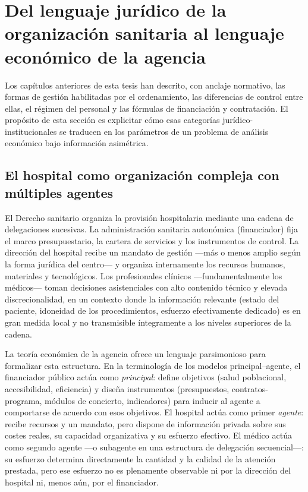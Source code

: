 \section{Del lenguaje jurídico de la organización sanitaria al lenguaje económico de la agencia}
\label{sec:bisagra}

Los capítulos anteriores de esta tesis han descrito, con anclaje normativo, las formas de gestión habilitadas por el ordenamiento, las diferencias de control entre ellas, el régimen del personal y las fórmulas de financiación y contratación. El propósito de esta sección es explicitar cómo esas categorías jurídico-institucionales se traducen en los parámetros de un problema de análisis económico bajo información asimétrica.

\subsection{El hospital como organización compleja con múltiples agentes}

El Derecho sanitario organiza la provisión hospitalaria mediante una cadena de delegaciones sucesivas. La administración sanitaria autonómica (financiador) fija el marco presupuestario, la cartera de servicios y los instrumentos de control. La dirección del hospital recibe un mandato de gestión ---más o menos amplio según la forma jurídica del centro--- y organiza internamente los recursos humanos, materiales y tecnológicos. Los profesionales clínicos ---fundamentalmente los médicos--- toman decisiones asistenciales con alto contenido técnico y elevada discrecionalidad, en un contexto donde la información relevante (estado del paciente, idoneidad de los procedimientos, esfuerzo efectivamente dedicado) es en gran medida local y no transmisible íntegramente a los niveles superiores de la cadena.

La teoría económica de la agencia \citep{laffont2002} ofrece un lenguaje parsimonioso para formalizar esta estructura. En la terminología de los modelos principal--agente, el financiador público actúa como \textit{principal}: define objetivos (salud poblacional, accesibilidad, eficiencia) y diseña instrumentos (presupuestos, contratos-programa, módulos de concierto, indicadores) para inducir al agente a comportarse de acuerdo con esos objetivos. El hospital actúa como primer \textit{agente}: recibe recursos y un mandato, pero dispone de información privada sobre sus costes reales, su capacidad organizativa y su esfuerzo efectivo. El médico actúa como segundo agente ---o subagente en una estructura de delegación secuencial---: su esfuerzo determina directamente la cantidad y la calidad de la atención prestada, pero ese esfuerzo no es plenamente observable ni por la dirección del hospital ni, menos aún, por el financiador.

